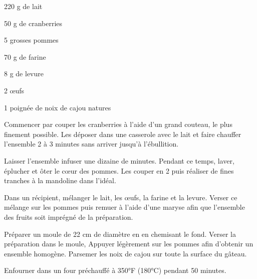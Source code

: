 


\totaltime{}


\begin{ingredients}
    \item 220 g de lait
    \item 50 g de cranberries
    \item 5 grosses pommes
    \item 70 g de farine
    \item 8 g de levure
    \item 2 œufs
    \item 1 poignée de noix de cajou natures
\end{ingredients}

\begin{steps}
    \item Commencer par couper les cranberries à l’aide d’un grand couteau, le plus finement possible. Les déposer dans une casserole avec le lait et faire chauffer l’ensemble 2 à 3 minutes sans arriver jusqu’à l’ébullition.
    \item Laisser l’ensemble infuser une dizaine de minutes. Pendant ce temps, laver, éplucher et ôter le cœur des pommes. Les couper en 2 puis réaliser de fines tranches à la mandoline dans l’idéal.
    \item Dans un récipient, mélanger le lait, les œufs, la farine et la levure. Verser ce mélange sur les pommes puis remuer à l’aide d’une maryse afin que l’ensemble des fruits soit imprégné de la préparation.
    \item Préparer un moule de 22 cm de diamètre en en chemisant le fond. Verser la préparation dans le moule, Appuyer légèrement sur les pommes afin d’obtenir un ensemble homogène. Parsemer les noix de cajou sur toute la surface du gâteau.
    \item Enfourner dans un four préchauffé à 350°F (180°C) pendant 50 minutes.
\end{steps}
